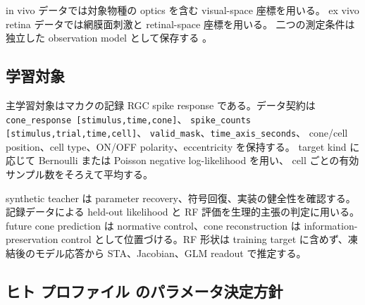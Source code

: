 \documentclass[a4paper,10pt,twocolumn,uplatex,dvipdfmx]{jsarticle}
\begin{document}
in vivo データでは対象物種の optics を含む visual-space 座標を用いる。
ex vivo retina データでは網膜面刺激と retinal-space 座標を用いる。
二つの測定条件は独立した observation model として保存する
\cite{cottaris2026}。

\subsection{学習対象}

主学習対象はマカクの記録 RGC spike response である。データ契約は
\texttt{cone\_response [stimulus,time,cone]}、
\texttt{spike\_counts [stimulus,trial,time,cell]}、
\texttt{valid\_mask}、\texttt{time\_axis\_seconds}、
cone/cell position、cell type、ON/OFF polarity、eccentricity を保持する。
target kind に応じて Bernoulli または Poisson negative log-likelihood を用い、
cell ごとの有効サンプル数をそろえて平均する。

synthetic teacher は parameter recovery、符号回復、実装の健全性を確認する。
記録データによる held-out likelihood と RF 評価を生理的主張の判定に用いる。
future cone prediction は normative control、cone reconstruction は
information-preservation control として位置づける。RF 形状は training target
に含めず、凍結後のモデル応答から STA、Jacobian、GLM readout で推定する。

\clearpage
\onecolumn

\subsection*{ヒト プロファイル のパラメータ決定方針}

\label{tab:model-policy-human}
\end{document}
